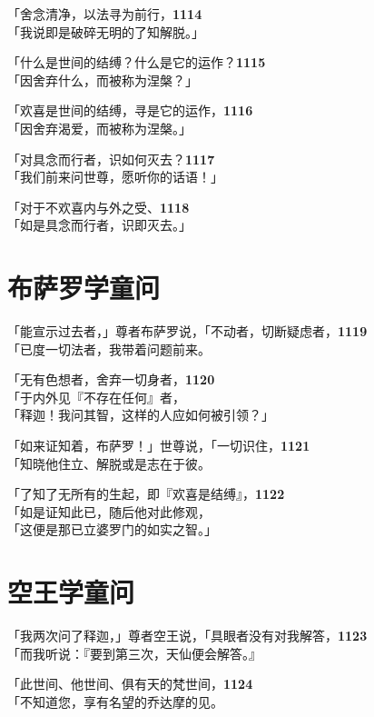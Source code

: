 「舍念清净，以法寻为前行，\hfill{\grayfootnotesize \textbf{1114}} \\
「我说即是破碎无明的了知解脱。」


「什么是世间的结缚？什么是它的运作？\hfill{\grayfootnotesize \textbf{1115}} \\
「因舍弃什么，而被称为涅槃？」


「欢喜是世间的结缚，寻是它的运作，\hfill{\grayfootnotesize \textbf{1116}} \\
「因舍弃渴爱，而被称为涅槃。」


「对具念而行者，识如何灭去？\hfill{\grayfootnotesize \textbf{1117}} \\
「我们前来问世尊，愿听你的话语！」


「对于不欢喜内与外之受、\hfill{\grayfootnotesize \textbf{1118}} \\
「如是具念而行者，识即灭去。」


\section{布萨罗学童问}

「能宣示过去者，」尊者布萨罗说，「不动者，切断疑虑者，\hfill{\grayfootnotesize \textbf{1119}} \\
「已度一切法者，我带着问题前来。


「无有色想者，舍弃一切身者，\hfill{\grayfootnotesize \textbf{1120}} \\
「于内外见『不存在任何』者，\\
「释迦！我问其智，这样的人应如何被引领？」


「如来证知着，布萨罗！」世尊说，「一切识住，\hfill{\grayfootnotesize \textbf{1121}} \\
「知晓他住立、解脱或是志在于彼。


「了知了无所有的生起，即『欢喜是结缚』，\hfill{\grayfootnotesize \textbf{1122}} \\
「如是证知此已，随后他对此修观，\\
「这便是那已立婆罗门的如实之智。」


\section{空王学童问}

「我两次问了释迦，」尊者空王说，「具眼者没有对我解答，\hfill{\grayfootnotesize \textbf{1123}} \\
「而我听说：『要到第三次，天仙便会解答。』


「此世间、他世间、俱有天的梵世间，\hfill{\grayfootnotesize \textbf{1124}} \\
「不知道您，享有名望的乔达摩的见。


